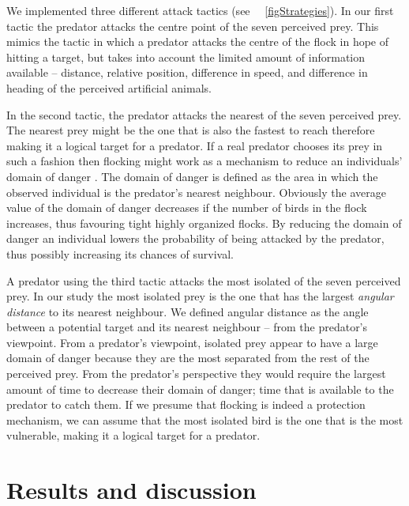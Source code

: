 We implemented three different attack tactics (see \figurename~~\ref{figStrategies}). In our first tactic the predator attacks the centre point of the seven perceived prey. This mimics the tactic in which a predator attacks the centre of the flock in hope of hitting a target, but takes into account the limited amount of information available -- distance, relative position, difference in speed, and difference in heading of the perceived artificial animals.

In the second tactic, the predator attacks the nearest of the seven perceived prey. The nearest prey might be the one that is also the fastest to reach therefore making it a logical target for a predator. If a real predator chooses its prey in such a fashion then flocking might work as a mechanism to reduce an individuals' domain of danger \cite{hamilton1971geometry}. The domain of danger is defined as the area in which the observed individual is the predator's nearest neighbour. Obviously the average value of the domain of danger decreases if the number of birds in the flock increases, thus favouring tight highly organized flocks. By reducing the domain of danger an individual lowers the probability of being attacked by the predator, thus possibly increasing its chances of survival.

A predator using the third tactic attacks the most isolated of the seven perceived prey. In our study the most isolated prey is the one that has the largest \emph{angular distance} to its nearest neighbour. We defined angular distance as the angle between a potential target and its nearest neighbour -- from the predator's viewpoint. From a predator's viewpoint, isolated prey appear to have a large domain of danger because they are the most separated from the rest of the perceived prey. From the predator's perspective they would require the largest amount of time to decrease their domain of danger; time that is available to the predator to catch them. If we presume that flocking is indeed a protection mechanism, we can assume that the most isolated bird is the one that is the most vulnerable, making it a logical target for a predator.

\section{Results and discussion}

